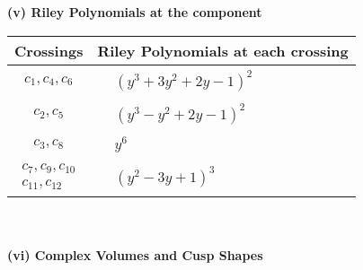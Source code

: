 \documentclass[1p]{elsarticle_modified}
\theoremstyle{definition}
\begin{document}
\newpage\renewcommand{\arraystretch}{1}
\flushleft \textbf{(v) Riley Polynomials at the component}\newline \\
\begin{tabular}{m{50pt}|m{274pt}}
Crossings & \hspace{64pt}Riley Polynomials at each crossing \\
\hline $$\begin{aligned}c_{1},c_{4},c_{6}\end{aligned}$$&$\begin{aligned}
&(y^3+3 y^2+2 y-1)^2
\end{aligned}$\\
\hline $$\begin{aligned}c_{2},c_{5}\end{aligned}$$&$\begin{aligned}
&(y^3- y^2+2 y-1)^2
\end{aligned}$\\
\hline $$\begin{aligned}c_{3},c_{8}\end{aligned}$$&$\begin{aligned}
&y^6
\end{aligned}$\\
\hline $$\begin{aligned}c_{7},c_{9},c_{10}\\c_{11},c_{12}\end{aligned}$$&$\begin{aligned}
&(y^2-3 y+1)^3
\end{aligned}$\\
\hline
\end{tabular}\\~\\
\newpage\flushleft \textbf{(vi) Complex Volumes and Cusp Shapes}
\end{document}
